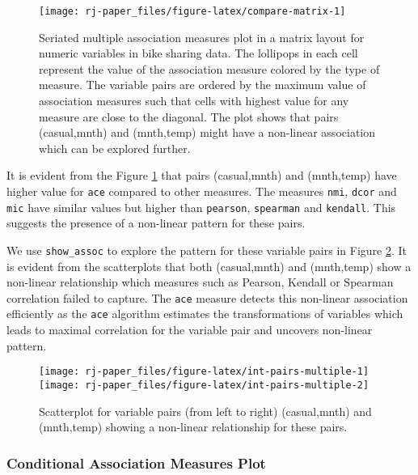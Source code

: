 \begin{figure}

{\centering \texttt{[image: rj-paper\_files/figure-latex/compare-matrix-1]} 

}

\caption{Seriated multiple association measures plot in a matrix layout for numeric variables in bike sharing data. The lollipops in each cell represent the value of the association measure colored by the type of measure. The variable pairs are ordered by the maximum value of association measures such that cells with highest value for any measure are close to the diagonal. The plot shows that pairs (casual,mnth) and (mnth,temp) might have a non-linear association which can be explored further.}\label{fig:compare-matrix}
\end{figure}

It is evident from the Figure \ref{fig:compare-matrix} that pairs (casual,mnth) and (mnth,temp) have higher value for \texttt{ace} compared to other measures. The measures \texttt{nmi}, \texttt{dcor} and \texttt{mic} have similar values but higher than \texttt{pearson}, \texttt{spearman} and \texttt{kendall}. This suggests the presence of a non-linear pattern for these pairs.

We use \texttt{show\_assoc} to explore the pattern for these variable pairs in Figure \ref{fig:int-pairs-multiple}. It is evident from the scatterplots that both (casual,mnth) and (mnth,temp) show a non-linear relationship which measures such as Pearson, Kendall or Spearman correlation failed to capture. The \texttt{ace} measure detects this non-linear association efficiently as the \texttt{ace} algorithm estimates the transformations of variables which leads to maximal correlation for the variable pair and uncovers non-linear pattern.

\begin{figure}
\texttt{[image: rj-paper\_files/figure-latex/int-pairs-multiple-1]} \texttt{[image: rj-paper\_files/figure-latex/int-pairs-multiple-2]} \caption{Scatterplot for variable pairs (from left to right) (casual,mnth) and (mnth,temp) showing a non-linear relationship for these pairs.}\label{fig:int-pairs-multiple}
\end{figure}

\hypertarget{conditional-association-measures-plot}{%
\subsubsection{Conditional Association Measures Plot}\label{conditional-association-measures-plot}}

